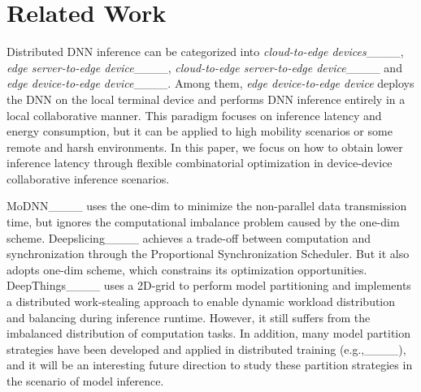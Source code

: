 \section{Related Work}
\label{sec-related}
 Distributed DNN inference can be categorized into \emph{cloud-to-edge devices}____, \emph{edge server-to-edge device}____, \emph{cloud-to-edge server-to-edge device}____ and \emph{edge device-to-edge device}____. Among them, \emph{edge device-to-edge device} deploys the DNN on the local terminal device and performs DNN inference entirely in a local collaborative manner. This paradigm focuses on inference latency and energy consumption, but it can be applied to high mobility scenarios or some remote and harsh environments. In this paper, we focus on how to obtain lower inference latency through flexible combinatorial optimization in device-device collaborative inference scenarios.

MoDNN____ uses the one-dim to minimize the non-parallel data transmission time, but ignores the computational imbalance problem caused by the one-dim scheme. 
Deepslicing____ achieves a trade-off between computation and synchronization through the Proportional Synchronization Scheduler. But it also adopts one-dim scheme, which constrains its optimization opportunities. 
DeepThings____ uses a 2D-grid to perform model partitioning and implements a distributed work-stealing approach to enable dynamic workload distribution and balancing during inference runtime. However, it still suffers from the imbalanced distribution of computation tasks. In addition, many model partition strategies have been developed and applied in distributed training (e.g.,____), and it will be an interesting future direction to study these partition strategies in the scenario of model inference. 

